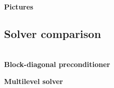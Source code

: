 \documentclass[a4paper,12pt]{amsart}
\numberwithin{equation}{section}
\renewcommand{\div}{\operatorname{div}}
\def\bsigma{{\boldsymbol \sigma}}
\begin{document}
\textbf{Pictures}

\subsection{Solver comparison} ~\\

\textbf{Block-diagonal preconditioner}

\textbf{Multilevel solver}


%
%
%
\end{document}
